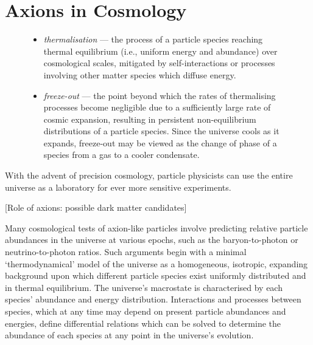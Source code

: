 \chapter{Axions in Cosmology}

\begin{figure}[t!]
\begin{aside}
\begin{itemize}[leftmargin=0.75em]\setlength\itemsep{0.25ex}
	\item \emph{thermalisation}
---	the process of a particle species reaching thermal equilibrium (i.e., uniform energy and abundance) over cosmological scales, mitigated by self-interactions or processes involving other matter species which diffuse energy.
	\item \emph{freeze-out}
---	the point beyond which the rates of thermalising processes become negligible due to a sufficiently large rate of cosmic expansion, resulting in persistent non-equilibrium distributions of a particle species.
Since the universe cools as it expands, freeze-out may be viewed as the change of phase of a species from a gas to a cooler condensate.
\end{itemize}
\end{aside}
\end{figure}

With the advent of precision cosmology, particle physicists can use the entire universe as a laboratory for ever more sensitive experiments.

[Role of axions: possible dark matter candidates]

Many cosmological tests of axion-like particles involve predicting relative particle abundances in the universe at various epochs, such as the baryon-to-photon or neutrino-to-photon ratios.
Such arguments begin with a minimal `thermodynamical' model of the universe as a homogeneous, isotropic, expanding background upon which different particle species exist uniformly distributed and in thermal equilibrium.
The universe's macrostate is characterised by each species' abundance and energy distribution.
Interactions and processes between species, which at any time may depend on present particle abundances and energies, define differential relations which can be solved to determine the abundance of each species at any point in the universe's evolution.

